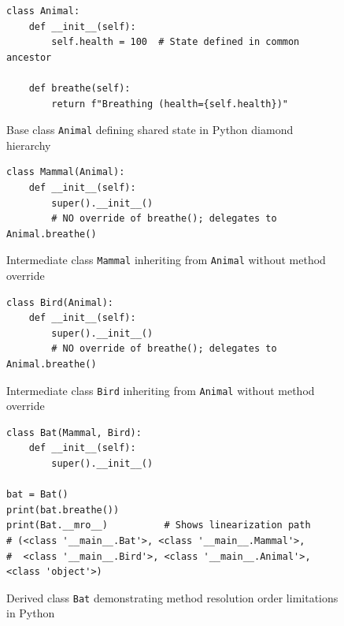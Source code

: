 \begin{figure}[htbp]
    \centering
    \begin{verbatim}
class Animal:
    def __init__(self):
        self.health = 100  # State defined in common ancestor
    
    def breathe(self):
        return f"Breathing (health={self.health})"
    \end{verbatim}
    \caption{Base class \texttt{Animal} defining shared state in Python diamond hierarchy}
    \label{fig:py-diamond-animal}
\end{figure}

\begin{figure}[htbp]
    \centering
    \begin{verbatim}
class Mammal(Animal):
    def __init__(self):
        super().__init__()
        # NO override of breathe(); delegates to Animal.breathe()
    \end{verbatim}
    \caption{Intermediate class \texttt{Mammal} inheriting from \texttt{Animal} without method override}
    \label{fig:py-diamond-mammal}
\end{figure}

\begin{figure}[htbp]
    \centering
    \begin{verbatim}
class Bird(Animal):
    def __init__(self):
        super().__init__()
        # NO override of breathe(); delegates to Animal.breathe()
    \end{verbatim}
    \caption{Intermediate class \texttt{Bird} inheriting from \texttt{Animal} without method override}
    \label{fig:py-diamond-bird}
\end{figure}

\begin{figure}[htbp]
    \centering
    \begin{verbatim}
class Bat(Mammal, Bird):
    def __init__(self):
        super().__init__()

bat = Bat()
print(bat.breathe())
print(Bat.__mro__)          # Shows linearization path
# (<class '__main__.Bat'>, <class '__main__.Mammal'>,
#  <class '__main__.Bird'>, <class '__main__.Animal'>, <class 'object'>)
    \end{verbatim}
    \caption{Derived class \texttt{Bat} demonstrating method resolution order limitations in Python}
    \label{fig:py-diamond-bat}
\end{figure}

